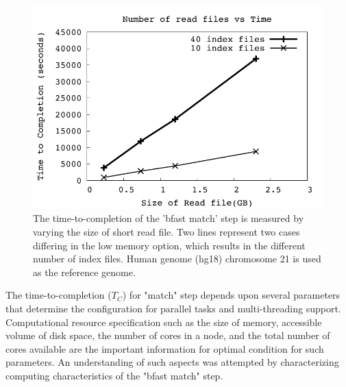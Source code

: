 \documentclass{acm_proc_article-sp}
\begin{document}
\begin{figure}
 \centering
\includegraphics[scale=0.66]{figures/readsvstime.pdf}

\caption{\small The time-to-completion of the 'bfast match' step is
  measured by varying the size of short read file.  Two lines
  represent two cases differing in the low memory option, which
  results in the different number of index files.  Human genome (hg18)
  chromosome 21 is used as the reference genome. }
  \label{fig:parallel-execution} 
 \end{figure}


The time-to-completion ($T_C$) for "match" step depends upon several
parameters that determine the configuration for parallel tasks and
multi-threading support.  Computational resource specification such as
the size of memory, accessible volume of disk space, the number of
cores in a node, and the total number of cores available are the
important information for optimal condition for such parameters.  An
understanding of such aspects was attempted by characterizing
computing characteristics of the "bfast match" step.  
\end{document}
